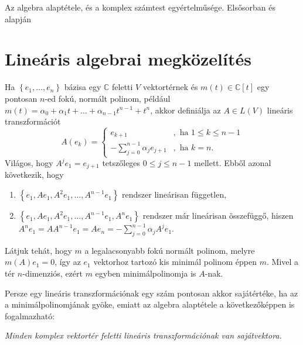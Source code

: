 \documentclass[9pt, showtrims]{memoir}
\theoremstyle{plain}
\theoremstyle{remark}
\theoremstyle{definition}
\begin{document}
Az algebra alaptétele, és a komplex számtest egyértelműsége. Elsősorban \citet{MR1415833} és \citet{10.2307/3647746} alapján
\section{Lineáris algebrai megközelítés}
Ha $\left\{ e_1,\dots,e_n \right\}$ bázisa egy $\mathbb{C}$ feletti $V$ vektortérnek
és $m\left( t \right)\in\mathbb{C}\left[ t \right]$ egy pontosan $n$-ed fokú, 
normált polinom,
például
$m\left( t \right)=\alpha_0+\alpha_1 t+\dots+\alpha_{n-1}t^{n-1}+t^{n}$,
akkor definiálja az $A\in L\left( V \right)$ lineáris transzformációt
\[
    A\left( e_k \right)=
    \begin{cases}
        e_{k+1}&, \text{ ha } 1\leq k \leq n-1\\
        -\sum_{j=0}^{n-1}\alpha_j e_{j+1}&, \text{ ha } k=n.
    \end{cases}
\]
Világos, hogy $A^je_1=e_{j+1}$ tetszőleges $0\leq j\leq n-1$ mellett.
Ebből azonal következik, hogy 
\begin{enumerate}
    \item 
    $\left\{ e_1, Ae_1,A^2e_1,\dots,A^{n-1}e_1\right\}$ rendszer lineárisan független,
    \item
    $\left\{ e_1, Ae_1,A^2e_1,\dots,A^{n-1}e_1,A^ne_1\right\}$ rendszer már lineárisan összefüggő,
    hiszen
    $A^ne_1=AA^{n-1}e_1=Ae_n=-\sum_{j=0}^{n-1}\alpha_j A^je_1$.
\end{enumerate}
Látjuk tehát, hogy $m$ a legalacsonyabb fokú normált polinom, melyre
$m\left( A \right)e_1=0$,
így az $e_1$ vektorhoz tartozó kis minimál polinom éppen $m$.
Mivel a tér $n$-dimenziós, ezért $m$ egyben minimálpolinomja is $A$-nak.

Persze egy lineáris transzformációnak egy szám pontosan akkor sajátértéke,
ha az a minimálpolinomjának gyöke,
emiatt 
az algebra alaptétele a következőképpen is fogalmazható:
\begin{center}
\emph{Minden komplex vektortér feletti lineáris transzformációnak van sajátvektora.}
\end{center}
\end{document}
